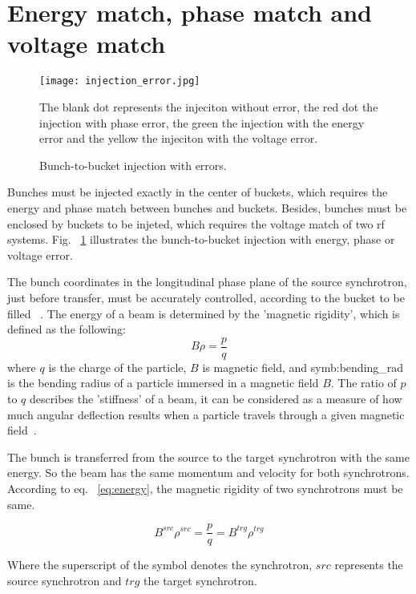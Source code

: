 \section{Energy match, phase match and voltage match}
\begin{figure}[!htb]
   \centering   
   \texttt{[image: injection\_error.jpg]}
   \caption{Bunch-to-bucket injection with errors.}{The blank dot represents the injeciton without error, the red dot the injection with phase error, the green the injection with the energy error and the yellow the injeciton with the voltage error.}
   \label{injection_error}
\end{figure} 
Bunches must be injected exactly in the center of buckets, which requires the energy and phase match between bunches and buckets. Besides, bunches must be enclosed by buckets to be injeted, which requires the voltage match of two rf systems. Fig. ~\ref{injection_error} illustrates the bunch-to-bucket injection with energy, phase or voltage error. 

The bunch coordinates in the longitudinal phase plane of the source synchrotron, just before transfer, must be accurately controlled, according to the bucket to be filled ~\cite{garoby_timing_1984}. The energy of a beam is determined by the 'magnetic rigidity', which is defined as the following:
\begin{equation}
	\label{eq:energy}
	B\rho =\frac{p}{q}
\end{equation}
where $q$ is the charge of the particle, $B$ is magnetic field, and \gls{symb:bending_rad} is the bending radius of a particle immersed in a magnetic field $B$. The ratio of $p$ to $q$ describes the 'stiffness’ of a beam, it can be considered as a measure of how much angular deflection results when a particle travels through a given magnetic field~\cite{barletta_overview_????}.

The bunch is transferred from the source to the target synchrotron with the same energy. So the beam has the same momentum and velocity for both synchrotrons. According to eq. ~\ref{eq:energy}, the magnetic rigidity of two synchrotrons must be same.

\begin{equation}
	\label{eq:rigidity}
	B^{\mathit{src}}\rho^{\mathit{src}} =\frac{p}{q}=B^{\mathit{trg}}\rho^{\mathit{trg}}
\end{equation}

Where the superscript of the symbol denotes the synchrotron, $\mathit{src}$ represents the source synchrotron and $\mathit{trg}$ the target synchrotron.

